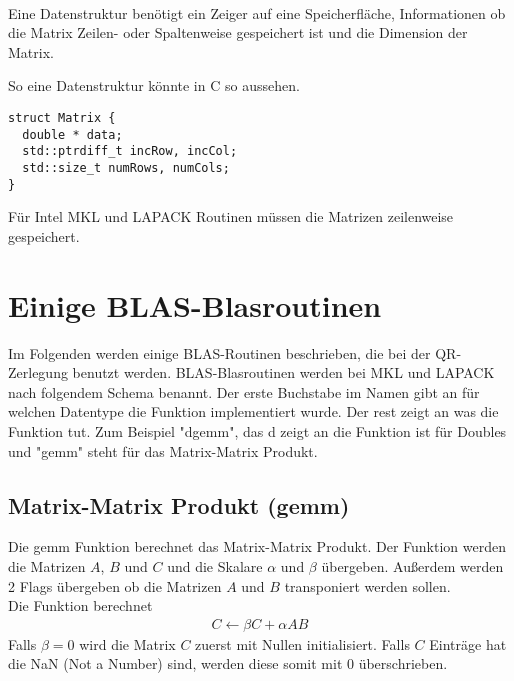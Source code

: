 \\



Eine Datenstruktur benötigt ein Zeiger auf eine Speicherfläche, Informationen ob die Matrix Zeilen- oder Spaltenweise gespeichert ist und die Dimension der Matrix. 

So eine Datenstruktur könnte in C so aussehen.
\begin{lstlisting}
struct Matrix {
  double * data;
  std::ptrdiff_t incRow, incCol;
  std::size_t numRows, numCols;
}
\end{lstlisting}

Für Intel MKL und LAPACK Routinen müssen die Matrizen zeilenweise gespeichert.


\section{Einige BLAS-Blasroutinen}
Im Folgenden werden einige BLAS-Routinen beschrieben, die bei der QR-Zerlegung benutzt werden.
BLAS-Blasroutinen werden bei MKL und LAPACK nach folgendem Schema benannt.
Der erste Buchstabe im Namen gibt an für welchen Datentype die Funktion implementiert wurde. Der rest zeigt an was die Funktion tut.
Zum Beispiel "dgemm", das d zeigt an die Funktion ist für Doubles und "gemm" steht für das Matrix-Matrix Produkt.

\subsection{Matrix-Matrix Produkt (gemm)}
Die gemm Funktion berechnet das Matrix-Matrix Produkt.
Der Funktion werden die Matrizen $A$, $B$ und $C$ und die Skalare $\alpha$ und $\beta$ übergeben. Außerdem werden 2 Flags übergeben ob die Matrizen $A$ und $B$ transponiert werden sollen.\\
Die Funktion berechnet
\begin{align}
	C \leftarrow \beta  C + \alpha  A  B
\end{align}
Falls $\beta = 0$ wird die Matrix $C$ zuerst mit Nullen initialisiert. Falls $C$ Einträge hat die NaN (Not a Number) sind, werden diese somit mit 0 überschrieben.


